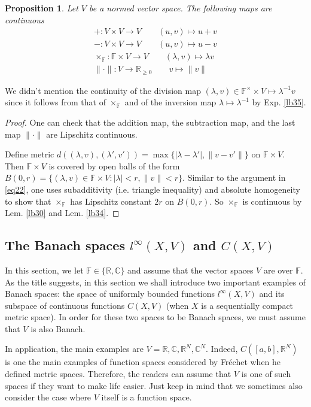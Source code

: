 \documentclass[12pt,b5paper,notitlepage]{article}
\theoremstyle{definition}
\theoremstyle{plain}
\newtheorem{pp}[df]{Proposition}
\newcommand{\Cbb}{\mathbb C}
\newcommand{\Rbb}{\mathbb R}
\newcommand{\Fbb}{\mathbb F}
\numberwithin{equation}{section}
\begin{document}
\begin{pp}\label{lb82}
Let $V$ be a normed vector space. The following maps are continuous
\begin{gather*}
+: V\times V\rightarrow V\qquad (u,v)\mapsto u+v\\
-: V\times V\rightarrow V\qquad (u,v)\mapsto u-v\\
\times_\Fbb: \Fbb\times V\rightarrow V\qquad (\lambda,v)\mapsto \lambda v\\
\lVert\cdot\lVert:V\rightarrow\Rbb_{\geq 0}\qquad v\mapsto \lVert v\lVert
\end{gather*}
\end{pp}

We didn't mention the continuity of the division map $(\lambda,v)\in\Fbb^\times\times V\mapsto\lambda^{-1}v$ since it follows from that of $\times_\Fbb$ and of the inversion map $\lambda\mapsto\lambda^{-1}$ by Exp. \ref{lb35}.

\begin{proof}
One can check that the addition map, the subtraction map, and the last map $\lVert\cdot\lVert$ are Lipschitz continuous. 

Define metric $d((\lambda,v),(\lambda',v'))=\max\{|\lambda-\lambda'|,\lVert v-v'\lVert \}$ on $\Fbb\times V$. Then $\Fbb\times V$ is covered by open balls of the form $B(0,r)=\{(\lambda,v)\in\Fbb\times V:|\lambda|<r,\lVert v\lVert<r\}$. Similar to the argument in \eqref{eq22}, one uses subadditivity (i.e. triangle inequality) and absolute homogeneity to show that $\times_\Fbb$ has Lipschitz constant $2r$ on $B(0,r)$. So $\times_\Fbb$ is continuous by Lem. \ref{lb30} and Lem. \ref{lb34}.
\end{proof}




\subsection{The Banach spaces $l^\infty(X,V)$ and $C(X,V)$}


In this section, we let $\Fbb\in\{\Rbb,\Cbb\}$ and assume that the vector spaces $V$ are over $\Fbb$. As the title suggests, in this section we shall introduce two important examples of Banach spaces: the space of uniformly bounded functions $l^\infty(X,V)$ and its  subspace of continuous functions $C(X,V)$ (when $X$ is a sequentially compact metric space).  In order for these two spaces to be Banach spaces, we must assume that $V$ is also Banach. 

In application, the main examples are $V=\Rbb,\Cbb,\Rbb^N,\Cbb^N$. Indeed, $C([a,b],\Rbb^N)$ is one the main examples of function spaces considered by Fr\'echet when he defined metric spaces. Therefore, the readers can assume that $V$ is one of such spaces if they want to make life easier. Just keep in mind that we sometimes also consider the case where $V$ itself is a function space.
\end{document}
